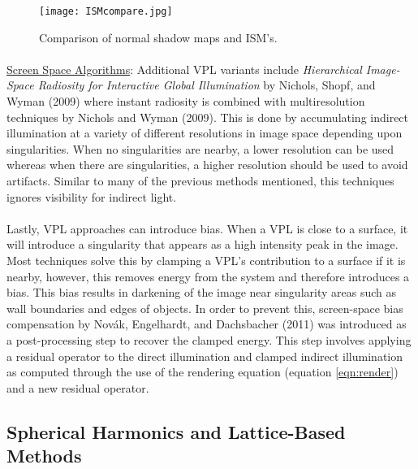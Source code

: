 \begin{figure}[h!]
  \centering
    \texttt{[image: ISMcompare.jpg]}
  \caption{Comparison of normal shadow maps and ISM's.}
	\label{fig:ISMcompare}
\end{figure}

\paragraph{}
\underline{Screen Space Algorithms}: Additional VPL variants include \textit{Hierarchical Image-Space Radiosity for Interactive Global Illumination} by Nichols, Shopf, and Wyman (2009) where instant radiosity is combined with multiresolution techniques by Nichols and Wyman (2009).  This is done by accumulating indirect illumination at a variety of different resolutions in image space depending upon singularities.  When no singularities are nearby, a lower resolution can be used whereas when there are singularities, a higher resolution should be used to avoid artifacts.  Similar to many of the previous methods mentioned, this techniques ignores visibility for indirect light.

\paragraph{}
Lastly, VPL approaches can introduce bias.  When a VPL is close to a surface, it will introduce a singularity that appears as a high intensity peak in the image.  Most techniques solve this by clamping a VPL's contribution to a surface if it is nearby, however, this removes energy from the system and therefore introduces a bias.  This bias results in darkening of the image near singularity areas such as wall boundaries and edges of objects.  In order to prevent this, screen-space bias compensation by Nov\'{a}k, Engelhardt, and Dachsbacher (2011) was introduced as a post-processing step to recover the clamped energy.  This step involves applying a residual operator to the direct illumination and clamped indirect illumination as computed through the use of the rendering equation (equation \ref{eqn:render}) and a new residual operator.

\subsection{Spherical Harmonics and Lattice-Based Methods}
